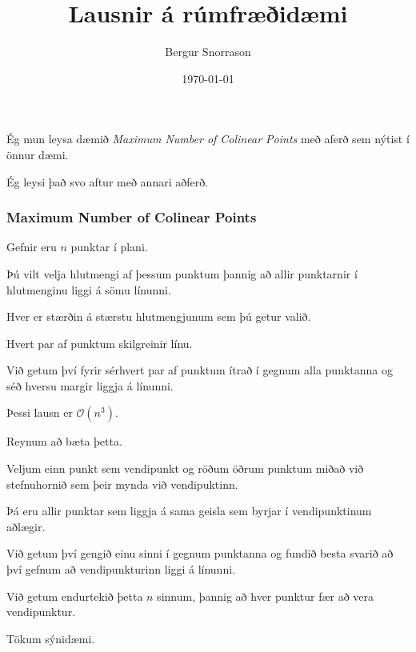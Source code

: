 \title{Lausnir á rúmfræðidæmi}
\author{Bergur Snorrason}
\date{\today}



\frame{\titlepage}

{
	{
		\item<1-> Ég mun leysa dæmið \emph{Maximum Number of Colinear Points} með aferð sem nýtist í önnur dæmi.
		\item<2-> Ég leysi það svo aftur með annari aðferð.
	}
}

{
	\frametitle{Maximum Number of Colinear Points}
	{
		\item<1-> Gefnir eru $n$ punktar í plani.
		\item<2-> Þú vilt velja hlutmengi af þessum punktum þannig að allir punktarnir í hlutmenginu liggi á sömu línunni.
		\item<3-> Hver er stærðin á stærstu hlutmengjunum sem þú getur valið.
	}
}

{
	{
		\item<1-> Hvert par af punktum skilgreinir línu.
		\item<2-> Við getum því fyrir sérhvert par af punktum ítrað í gegnum alla punktanna og séð hversu margir liggja á línunni.
		\item<3-> Þessi lausn er $\mathcal{O}(n^3)$.
		\item<4-> Reynum að bæta þetta.
	}
}
{
	{
		\item<1-> Veljum einn punkt sem vendipunkt og röðum öðrum punktum miðað við stefnuhornið sem þeir mynda við vendipuktinn.
		\item<2-> Þá eru allir punktar sem liggja á sama geisla sem byrjar í vendipunktinum aðlægir.
		\item<3-> Við getum því gengið einu sinni í gegnum punktanna og fundið besta svarið að því gefnum að vendipunkturinn liggi á línunni.
		\item<4-> Við getum endurtekið þetta $n$ sinnum, þannig að hver punktur fær að vera vendipunktur.
		\item<5-> Tökum sýnidæmi.
	}
}

